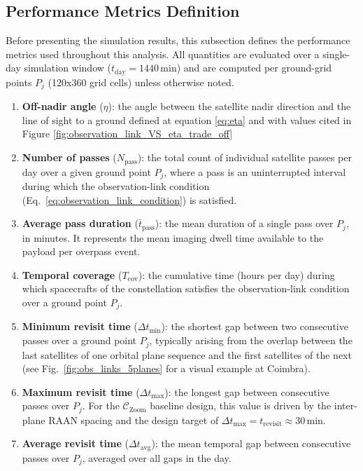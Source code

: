 \subsection{Performance Metrics Definition}
\label{sec:performance_metrics_definition}

Before presenting the simulation results, this subsection defines the performance metrics used throughout this analysis.  All quantities are evaluated over a single-day simulation window ($t_{\text{day}} = 1440$\,min) and are computed per ground-grid points $P_j$ (120x360 grid cells) unless otherwise noted.

\begin{enumerate}
    \item \textbf{Off-nadir angle} ($\eta$): the angle between the satellite nadir direction and the line of sight to a ground  defined at equation \ref{eq:eta} and with values cited in Figure \ref{fig:observation_link_VS_eta_trade_off}

    \item \textbf{Number of passes} ($N_{\text{pass}}$): the total count of individual satellite passes per day over a given ground point $P_j$, where a pass is an uninterrupted interval during which the observation-link condition (Eq.~\ref{eq:observation_link_condition}) is satisfied.

    \item \textbf{Average pass duration} ($\bar{t}_{\text{pass}}$): the mean duration of a single pass over $P_j$, in minutes. It represents the mean imaging dwell time available to the payload per overpass event.

    \item \textbf{Temporal coverage} ($T_{\text{cov}}$): the cumulative time (hours per day) during which spacecrafts of the constellation satisfies the observation-link condition over a ground point $P_j$.
    \item \textbf{Minimum revisit time} ($\Delta t_{\min}$): the shortest gap between two consecutive passes over a ground point $P_j$, typically arising from the overlap between the last satellites of one orbital plane sequence and the first satellites of the next (see Fig.~\ref{fig:obs_links_5planes} for a visual example at Coimbra).

    \item \textbf{Maximum revisit time} ($\Delta t_{\max}$): the longest gap between consecutive passes over $P_j$. For the $\mathcal{C}_{\text{Zoom}}$ baseline design, this value is driven by the inter-plane RAAN spacing and the design target of $\Delta t_{\max} = t_{\text{revisit}} \approx 30$\,min.

    \item \textbf{Average revisit time} ($\Delta t_{\text{avg}}$): the mean temporal gap between consecutive passes over $P_j$, averaged over all gaps in the day.
\end{enumerate}

